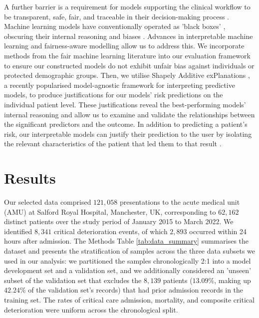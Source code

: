\documentclass[fleqn,10pt]{wlscirep}
\begin{document}
A further barrier is a requirement for models supporting the clinical workflow to be transparent, safe, fair, and traceable in their decision-making process \cite{Meyer18, Holzinger17}. Machine learning models have conventionally operated as 'black boxes' \cite{Velez17}, obscuring their internal reasoning and biases \cite{Holzinger17, Barocas16}. Advances in interpretable machine learning and fairness-aware modelling allow us to address this. We incorporate methods from the fair machine learning literature \cite{Mehrabi21, Barocas19} into our evaluation framework to ensure our constructed models do not exhibit unfair bias against individuals or protected demographic groups. Then, we utilise Shapely Additive exPlanations \cite{Lundberg18}, a recently popularised model-agnostic framework for interpreting predictive models, to produce justifications for our models’ risk predictions on the individual patient level. These justifications reveal the best-performing models' internal reasoning and allow us to examine and validate the relationships between the significant predictors and the outcome. In addition to predicting a patient’s risk, our interpretable models can justify their prediction to the user by isolating the relevant characteristics of the patient that led them to that result \cite{Shawi20, Lundberg18}.

\section*{Results}

Our selected data comprised $121,058$ presentations to the acute medical unit (AMU) at Salford Royal Hospital, Manchester, UK, corresponding to $62,162$ distinct patients over the study period of January 2015 to March 2022. We identified $8,341$ critical deterioration events, of which $2,893$ occurred within 24 hours after admission. The Methods Table \ref{tab:data_summary} summarises the dataset and presents the stratification of samples across the three data subsets we used in our analysis: we partitioned the samples chronologically 2:1 into a model development set and a validation set, and we additionally considered an 'unseen' subset of the validation set that excludes the $8,139$ patients ($13.09\%$, making up $42.24\%$ of the validation set's records) that had prior admission records in the training set. The rates of critical care admission, mortality, and composite critical deterioration were uniform across the chronological split.
\end{document}
